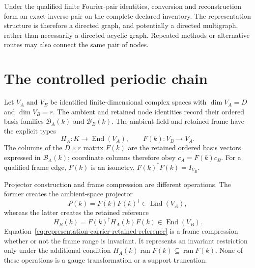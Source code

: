 \begin{remark}
Under the qualified finite Fourier-pair identities, conversion and
reconstruction form an exact inverse pair on the complete declared inventory.
The representation structure is therefore a
directed graph, and potentially a directed multigraph, rather than necessarily
a directed acyclic graph. Repeated methods or alternative routes may also
connect the same pair of nodes.
\end{remark}

\section{The controlled periodic chain}

Let $V_A$ and $V_B$ be identified finite-dimensional complex spaces with
$\dim V_A=D$ and $\dim V_B=r$. The ambient and retained node identities record
their ordered basis families $\mathcal B_A(k)$ and $\mathcal B_B(k)$. The
ambient field and retained frame have the explicit types
\begin{equation}
  H_A:K\longrightarrow\operatorname{End}(V_A),
  \qquad
  F(k):V_B\longrightarrow V_A.
  \label{eq:representation-carrier-ambient-frame-types}
\end{equation}
The columns of the $D\times r$ matrix $F(k)$ are the retained ordered basis
vectors expressed in $\mathcal B_A(k)$; coordinate columns therefore obey
$c_A=F(k)c_B$. For a qualified frame edge, $F(k)$ is an isometry,
$F(k)^\dagger F(k)=I_{V_B}$.

Projector construction and frame compression are different operations. The
former creates the ambient-space projector
\begin{equation}
  P(k)=F(k)F(k)^\dagger\in\operatorname{End}(V_A),
  \label{eq:representation-carrier-projector-construction}
\end{equation}
whereas the latter creates the retained reference
\begin{equation}
  H_B(k)=F(k)^\dagger H_A(k)F(k)
  \in\operatorname{End}(V_B).
  \label{eq:representation-carrier-retained-reference}
\end{equation}
Equation~\eqref{eq:representation-carrier-retained-reference} is a frame
compression whether or not the frame range is invariant. It represents an
invariant restriction only under the additional condition
$H_A(k)\operatorname{ran}F(k)\subseteq\operatorname{ran}F(k)$. None of these
operations is a gauge transformation or a support truncation.

